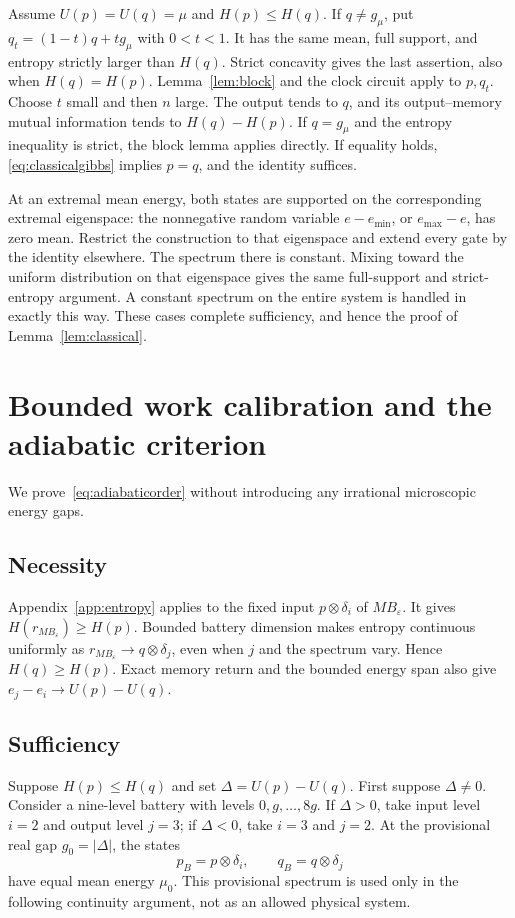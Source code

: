 Assume $U(p)=U(q)=\mu$ and $H(p)\le H(q)$. If $q\ne g_\mu$, put $q_t=(1-t)q+tg_\mu$ with $0<t<1$. It has the same mean, full support, and entropy strictly larger than $H(q)$. Strict concavity gives the last assertion, also when $H(q)=H(p)$. Lemma~\ref{lem:block} and the clock circuit apply to $p,q_t$. Choose $t$ small and then $n$ large. The output tends to $q$, and its output--memory mutual information tends to $H(q)-H(p)$. If $q=g_\mu$ and the entropy inequality is strict, the block lemma applies directly. If equality holds, \eqref{eq:classicalgibbs} implies $p=q$, and the identity suffices.

At an extremal mean energy, both states are supported on the corresponding extremal eigenspace: the nonnegative random variable $e-e_{\min}$, or $e_{\max}-e$, has zero mean. Restrict the construction to that eigenspace and extend every gate by the identity elsewhere. The spectrum there is constant. Mixing toward the uniform distribution on that eigenspace gives the same full-support and strict-entropy argument. A constant spectrum on the entire system is handled in exactly this way. These cases complete sufficiency, and hence the proof of Lemma~\ref{lem:classical}.

\section{Bounded work calibration and the adiabatic criterion}\label{app:work}
We prove~\eqref{eq:adiabaticorder} without introducing any irrational microscopic energy gaps.

\subsection{Necessity}
Appendix~\ref{app:entropy} applies to the fixed input $p\otimes\delta_i$ of $MB_\varepsilon$. It gives $H(r_{MB_\varepsilon})\ge H(p)$. Bounded battery dimension makes entropy continuous uniformly as $r_{MB_\varepsilon}\to q\otimes\delta_j$, even when $j$ and the spectrum vary. Hence $H(q)\ge H(p)$. Exact memory return and the bounded energy span also give $e_j-e_i\to U(p)-U(q)$.

\subsection{Sufficiency}
Suppose $H(p)\le H(q)$ and set $\Delta=U(p)-U(q)$. First suppose $\Delta\ne0$. Consider a nine-level battery with levels $0,g,\ldots,8g$. If $\Delta>0$, take input level $i=2$ and output level $j=3$; if $\Delta<0$, take $i=3$ and $j=2$. At the provisional real gap $g_0=|\Delta|$, the states
\[
 p_B=p\otimes\delta_i,\qquad q_B=q\otimes\delta_j
\]
have equal mean energy $\mu_0$. This provisional spectrum is used only in the following continuity argument, not as an allowed physical system.

